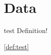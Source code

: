 \chapter{Data}\label{ch:data}

\Blindtext


\begin{definitionsBlock}{test}
Definition!
\end{definitionsBlock}
\cref{def:test}